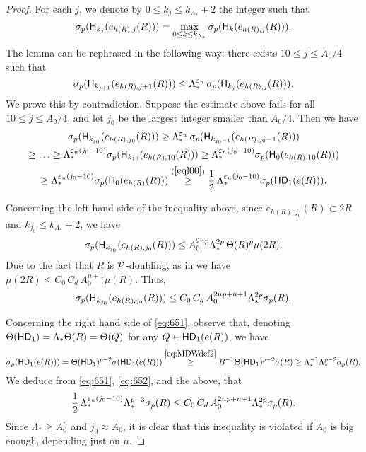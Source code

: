 \begin{proof}
For each $j$, we denote by $0\le k_j\le k_{\Lambda_*}+2$ the integer such that
$$\sigma_p({\mathsf{H}}_{k_j}(e_{h(R),j}(R))) = \max_{0\leq k\leq k_{\Lambda_*}} \sigma_p({\mathsf{H}}_{k}(e_{h(R),j}(R))).$$
The lemma can be rephrased in the following way: there exists $10\leq j\leq A_0/4$ such that
\begin{equation*}
\sigma_p({\mathsf{H}}_{k_{j+1}}(e_{h(R),j+1}(R))) \leq \Lambda_*^{{\varepsilon}_n} \,\sigma_p({\mathsf{H}}_{k_j}(e_{h(R),j}(R))).
\end{equation*}
We prove this by contradiction. Suppose the estimate above fails for all $10\leq j\leq A_0/4$, and let $j_0$ be the largest integer smaller than $A_0/4$.
Then we have
\begin{multline}\label{eq:651}
\sigma_p(\sH_{k_{j_0}}(e_{h(R),j_0}(R)))
  \geq \Lambda_*^{\ve_n}\,\sigma_p(\sH_{k_{j_0-1}}(e_{h(R),j_0-1}(R)))\\
\geq
\ldots\geq \Lambda_*^{\ve_n(j_0-10)}\sigma_p(\sH_{k_{10}}(e_{h(R),10}(R))) \geq \Lambda_*^{\ve_n(j_0-10)}\sigma_p(\sH_{0}(e_{h(R),10}(R)))\\
\geq  \Lambda_*^{\ve_n(j_0-10)}\sigma_p(\sH_{0}(e_{h(R)}(R))) \overset{\rf{eql00}}{\geq} \frac12\,\Lambda_*^{\ve_n(j_0-10)}
\sigma_p(\HD_1(e(R))),
\end{multline}

Concerning the left hand side of the inequality above, since $e_{h(R),j_0}(R)\subset 2R$ and $k_{j_0}\le k_{\Lambda_*}+2$, we have
$$
\sigma_p({\mathsf{H}}_{k_{j_0}}(e_{h(R),j_0}(R)))\leq A_0^{2np}
\Lambda_*^{2p}\,\Theta(R)^p\mu(2R).$$
Due to the fact that $R$ is ${\mathcal P}$-doubling, as in  we have
$\mu(2R)\leq C_0\,C_d\,A_0^{n+1}
\mu(R).$ Thus,
\begin{equation}\label{eq:652}
\sigma_p({\mathsf{H}}_{k_{j_0}}(e_{h(R),j_0}(R)))\leq C_0\,C_d\,A_0^{2np+n+1}
\Lambda_*^{2p}\sigma_p(R).
\end{equation}

Concerning the right hand side of \eqref{eq:651}, observe that, denoting $\Theta({\mathsf{HD}}_1)=\Lambda_*\Theta(R)=\Theta(Q)$ for any $Q\in{\mathsf{HD}}_1(e(R))$, we have
$$\sigma_p({\mathsf{HD}}_1(e(R))) = \Theta({\mathsf{HD}}_1)^{p-2}\sigma({\mathsf{HD}}_1(e(R)))\overset{\eqref{eq:MDWdef2}}{\ge} B^{-1}\Theta({\mathsf{HD}}_1)^{p-2}\sigma(R) \geq \Lambda_*^{-1}\Lambda_*^{p-2}\sigma_p(R).
$$
We deduce from \eqref{eq:651}, \eqref{eq:652}, and the above, that
$$\frac12\,\Lambda_*^{{\varepsilon}_n(j_0-10)}\Lambda_*^{p-3}
\sigma_p(R)\leq C_0\,C_d\,A_0^{2np+n+1}
\Lambda_*^{2p}\sigma_p(R).$$
Since $\Lambda_*\geq A_0^n$ and $j_0\approx A_0$, it is clear that this inequality is violated if $A_0$ is big 
enough, depending just on $n$.
\end{proof}
\vv


